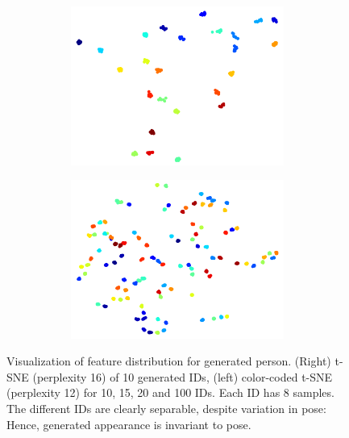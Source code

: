 \begin{figure}[htp]
\begin{subfigure}{0.49\linewidth}
			\begin{subfigure}{0.49\linewidth}
			\includegraphics[trim={0cm 0cm 0cm 0cm},clip, width=1.0\linewidth]{fig/factor/tsne20}
			\end{subfigure}
			\begin{subfigure}{0.49\linewidth}
			\includegraphics[trim={0cm 0cm 0cm 0cm},clip, width=1.0\linewidth]{fig/factor/tsne100}
			\end{subfigure}
		\end{subfigure}
		\caption{Visualization of feature distribution for generated person. (Right) t-SNE (perplexity 16) of 10 generated IDs, (left) color-coded t-SNE (perplexity 12) for 10, 15, 20 and 100 IDs. Each ID has 8 samples. The different IDs are clearly separable, despite variation in pose: Hence, generated appearance is invariant to pose.}
		\label{fig:pckcurve}
	\end{figure}


